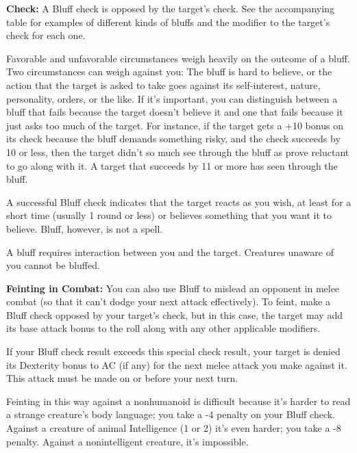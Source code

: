 
\textbf{Check:} A Bluff check is opposed by the target's  check. See the accompanying table for examples of different kinds of bluffs and the modifier to the target's  check for each one.

Favorable and unfavorable circumstances weigh heavily on the outcome of a bluff. Two circumstances can weigh against you: The bluff is hard to believe, or the action that the target is asked to take goes against its self-interest, nature, personality, orders, or the like. If it's important, you can distinguish between a bluff that fails because the target doesn't believe it and one that fails because it just asks too much of the target. For instance, if the target gets a +10 bonus on its  check because the bluff demands something risky, and the  check succeeds by 10 or less, then the target didn't so much see through the bluff as prove reluctant to go along with it. A target that succeeds by 11 or more has seen through the bluff.

A successful Bluff check indicates that the target reacts as you wish, at least for a short time (usually 1 round or less) or believes something that you want it to believe. Bluff, however, is not a  spell. 

A bluff requires interaction between you and the target. Creatures unaware of you cannot be bluffed.

\textbf{Feinting in Combat:} You can also use Bluff to mislead an opponent in melee combat (so that it can't dodge your next attack effectively). To feint, make a Bluff check opposed by your target's  check, but in this case, the target may add its base attack bonus to the roll along with any other applicable modifiers.

If your Bluff check result exceeds this special  check result, your target is denied its Dexterity bonus to AC (if any) for the next melee attack you make against it. This attack must be made on or before your next turn.

Feinting in this way against a nonhumanoid is difficult because it's harder to read a strange creature's body language; you take a -4 penalty on your Bluff check. Against a creature of animal Intelligence (1 or 2) it's even harder; you take a -8 penalty. Against a nonintelligent creature, it's impossible.

